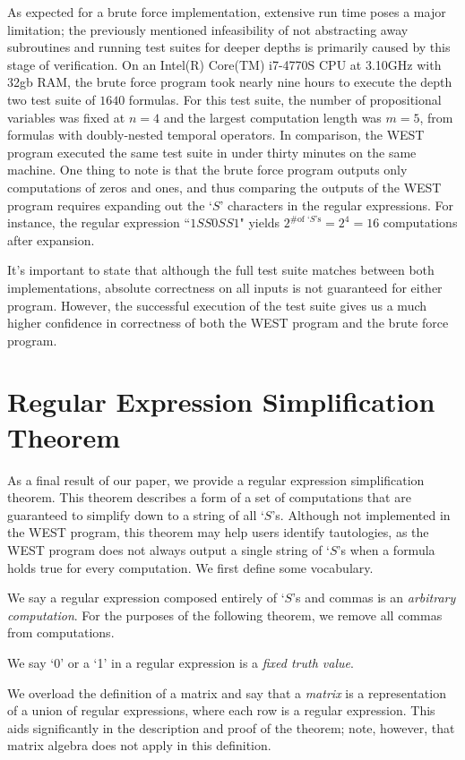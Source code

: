 \documentclass[runningheads]{llncs}
\begin{document}
As expected for a brute force implementation, extensive run time poses a major limitation; the previously mentioned infeasibility of not abstracting away subroutines and running test suites for deeper depths is primarily caused by this stage of verification. 
On an Intel(R) Core(TM) i7-4770S CPU at 3.10GHz with 32gb RAM, the brute force program took nearly nine hours to execute the depth two test suite of $1640$ formulas. 
For this test suite, the number of propositional variables was fixed at $n = 4$ and the largest computation length was $m = 5$, from formulas with doubly-nested temporal operators. 
In comparison, the WEST program executed the same test suite in under thirty minutes on the same machine. One thing to note is that the brute force program outputs only computations of zeros and ones, and thus comparing the outputs of the WEST program requires expanding out the `$S$' characters in the regular expressions. For instance, the regular expression ``$1SS0SS1$" yields $2^{\text{\# of `$S$'s}} = 2^4 = 16$ computations after expansion.

It's important to state that although the full test suite matches between both implementations, absolute correctness on all inputs is not guaranteed for either program. However, the successful execution of the test suite gives us a much higher confidence in correctness of both the WEST program and the brute force program. 


\section{Regular Expression Simplification Theorem} \label{simpsection}
 As a final result of our paper, we provide a regular expression simplification theorem. This theorem describes a form of a set of computations that are guaranteed to simplify down to a string of all `$S$'s. Although not implemented in the WEST program, this theorem may help users identify tautologies, as the WEST program does not always output a single string of `$S$'s when a formula holds true for every computation. We first define some vocabulary.

\begin{definition}
We say a regular expression composed entirely of `$S$'s and commas is an \emph{arbitrary computation}. For the purposes of the following theorem, we remove all commas from computations.
\end{definition}
\begin{definition}
We say `0' or a `1' in a regular expression is a \emph{fixed truth value}.
\end{definition}
\begin{definition}
We overload the definition of a matrix and say that a \emph{matrix} is a representation of a union of regular expressions, where each row is a regular expression. This aids significantly in the description and proof of the theorem; note, however, that matrix algebra does not apply in this definition. 
\end{definition}
\end{document}
